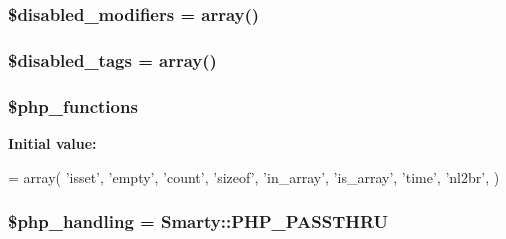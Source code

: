 \subsubsection[{\$disabled\+\_\+modifiers}]{\setlength{\rightskip}{0pt plus 5cm}\$disabled\+\_\+modifiers = array()}\label{class_smarty___security_a2b05ea7f3d61015d28f4b60fd7aec870}
\hypertarget{class_smarty___security_aff1c2833a6915a9a74ef13a4f57b2ecf}{}
\subsubsection[{\$disabled\+\_\+tags}]{\setlength{\rightskip}{0pt plus 5cm}\$disabled\+\_\+tags = array()}\label{class_smarty___security_aff1c2833a6915a9a74ef13a4f57b2ecf}
\hypertarget{class_smarty___security_ae18d58916b29bf6fb282992c68a966bc}{}
\subsubsection[{\$php\+\_\+functions}]{\setlength{\rightskip}{0pt plus 5cm}\$php\+\_\+functions}\label{class_smarty___security_ae18d58916b29bf6fb282992c68a966bc}
{\bfseries Initial value\+:}
\begin{DoxyCode}
= array(
        \textcolor{stringliteral}{'isset'}, \textcolor{stringliteral}{'empty'},
        \textcolor{stringliteral}{'count'}, \textcolor{stringliteral}{'sizeof'},
        \textcolor{stringliteral}{'in\_array'}, \textcolor{stringliteral}{'is\_array'},
        \textcolor{stringliteral}{'time'},
        \textcolor{stringliteral}{'nl2br'},
    )
\end{DoxyCode}
\hypertarget{class_smarty___security_abb37c3c6b2bcb9a527c4139bffb7e6ca}{}
\subsubsection[{\$php\+\_\+handling}]{\setlength{\rightskip}{0pt plus 5cm}\$php\+\_\+handling = {\bf Smarty\+::\+P\+H\+P\+\_\+\+P\+A\+S\+S\+T\+H\+R\+U}}\label{class_smarty___security_abb37c3c6b2bcb9a527c4139bffb7e6ca}
\hypertarget{class_smarty___security_aef98f7874c2babd06275f77d62af7d1f}{}

